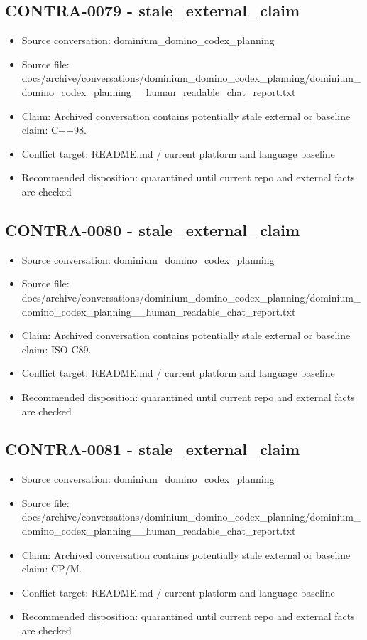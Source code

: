 \documentclass[11pt,a4paper]{report}
\begin{document}
\subsection{CONTRA-0079 - stale\_external\_claim}

\begin{itemize}
\item Source conversation: dominium\_domino\_codex\_planning
\item Source file: docs/archive/conversations/dominium\_domino\_codex\_planning/dominium\_domino\_codex\_planning\_\_human\_readable\_chat\_report.txt
\item Claim: Archived conversation contains potentially stale external or baseline claim: C++98.
\item Conflict target: README.md / current platform and language baseline
\item Recommended disposition: quarantined until current repo and external facts are checked
\end{itemize}

\subsection{CONTRA-0080 - stale\_external\_claim}

\begin{itemize}
\item Source conversation: dominium\_domino\_codex\_planning
\item Source file: docs/archive/conversations/dominium\_domino\_codex\_planning/dominium\_domino\_codex\_planning\_\_human\_readable\_chat\_report.txt
\item Claim: Archived conversation contains potentially stale external or baseline claim: ISO C89.
\item Conflict target: README.md / current platform and language baseline
\item Recommended disposition: quarantined until current repo and external facts are checked
\end{itemize}

\subsection{CONTRA-0081 - stale\_external\_claim}

\begin{itemize}
\item Source conversation: dominium\_domino\_codex\_planning
\item Source file: docs/archive/conversations/dominium\_domino\_codex\_planning/dominium\_domino\_codex\_planning\_\_human\_readable\_chat\_report.txt
\item Claim: Archived conversation contains potentially stale external or baseline claim: CP/M.
\item Conflict target: README.md / current platform and language baseline
\item Recommended disposition: quarantined until current repo and external facts are checked
\end{itemize}
\end{document}
